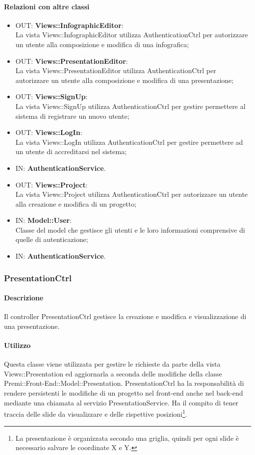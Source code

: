 	\paragraph{Relazioni con altre classi}
	\begin{itemize}
	  \item OUT: \textbf{Views::InfographicEditor}:\\
		La vista Views::InfographicEditor utilizza AuthenticationCtrl per autorizzare un utente alla composizione e modifica di una infografica;	
	  \item OUT: \textbf{Views::PresentationEditor}:\\
		La vista Views::PresentationEditor utilizza AuthenticationCtrl per autorizzare un utente alla composizione e modifica di una presentazione;
	  \item OUT: \textbf{Views::SignUp}:\\
		La vista Views::SignUp utilizza AuthenticationCtrl per gestire permettere al sistema di registrare un nuovo utente;
	  \item OUT: \textbf{Views::LogIn}:\\
	  		La vista Views::LogIn utilizza AuthenticationCtrl per gestire permettere ad un utente di accreditarsi nel sistema;
	  \item IN: \textbf{AuthenticationService}.	
	  \item OUT: \textbf{Views::Project}:\\
		La vista Views::Project utilizza AuthenticationCtrl per autorizzare un utente alla creazione e modifica di un progetto;	
	  \item IN: \textbf{Model::User}:\\
		Classe del model che gestisce gli utenti e le loro informazioni comprensive di quelle di autenticazione;
	  \item IN: \textbf{AuthenticationService}.
	  
	\end{itemize}	
	
\newpage
\subsubsection{PresentationCtrl}
	\paragraph{Descrizione}
	Il controller PresentationCtrl gestisce la creazione e modifica e visualizzazione di una presentazione.
	
	\paragraph{Utilizzo}
	Questa classe viene utilizzata per gestire le richieste da parte della vista Views::Presentation ed aggiornarla a seconda delle modifiche della classe Premi::Front-End::Model::Presentation. PresentationCtrl ha la responsabilità di rendere persistenti le modifiche di un progetto nel front-end anche nel back-end mediante una chiamata al servizio PresentationService.
	Ha il compito di tener traccia delle slide da visualizzare e delle rispettive posizioni\footnote{La presentazione è organizzata secondo una griglia, quindi per ogni slide è necessario salvare le coordinate X e Y.}.
